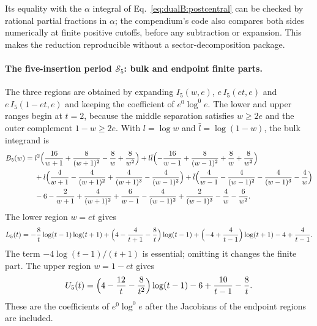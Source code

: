 \documentclass[11pt,a4paper]{article}
\numberwithin{equation}{section}
\begin{document}
Its equality with the $\alpha$ integral of Eq.~\eqref{eq:dualB:postcentral} can be checked by rational partial
fractions in $\alpha$; the compendium's code also compares both sides numerically at finite positive cutoffs, before
any subtraction or expansion. This makes the reduction reproducible without a sector-decomposition package.

\paragraph{The five-insertion period $\mathcal S_5$: bulk and endpoint finite parts.} The three regions are obtained by
expanding $I_5(w,e)$, $e\,I_5(et,e)$ and $e\,I_5(1-et,e)$ and keeping the coefficient of $e^0\log^0e$. The lower and
upper ranges begin at $t=2$, because the middle separation satisfies $w\ge2e$ and the outer complement $1-w\ge2e$.
With $l=\log w$ and $\bar l=\log(1-w)$, the bulk integrand is
\begin{equation}
\begin{aligned}
 B_5(w)={}&l^2\Bigl(\frac{16}{w+1}+\frac8{(w+1)^2}-\frac8w+\frac8{w^2}\Bigr)
 +l\bar l\Bigl(-\frac{16}{w-1}+\frac8{(w-1)^2}+\frac8w+\frac8{w^2}\Bigr)\\
 &+l\Bigl(\frac4{w+1}-\frac4{(w+1)^2}+\frac4{(w+1)^3}-\frac4{(w-1)^2}\Bigr)
 +\bar l\Bigl(\frac4{w-1}-\frac4{(w-1)^2}-\frac4{(w-1)^3}-\frac4w\Bigr)\\
 &-6-\frac2{w+1}+\frac4{(w+1)^2}+\frac6{w-1}-\frac4{(w-1)^2}+\frac2{(w-1)^3}-\frac4w-\frac6{w^2}.
\end{aligned}
\label{eq:dualB:B5}
\end{equation}
The lower region $w=et$ gives
\begin{equation}
 L_5(t)=-\frac8t\log(t-1)\log(t+1)+\Bigl(4-\frac4{t+1}-\frac8t\Bigr)\log(t-1)
 +\Bigl(-4+\frac4{t-1}\Bigr)\log(t+1)-4+\frac4{t-1}.
 \label{eq:dualB:L5}
\end{equation}
The term $-4\log(t-1)/(t+1)$ is essential; omitting it changes the finite part. The upper region $w=1-et$ gives
\begin{equation}
 U_5(t)=\Bigl(4-\frac{12}{t}-\frac8{t^2}\Bigr)\log(t-1)-6+\frac{10}{t-1}-\frac8t.
 \label{eq:dualB:U5}
\end{equation}
These are the coefficients of $e^0\log^0e$ after the Jacobians of the endpoint regions are included.
\end{document}

